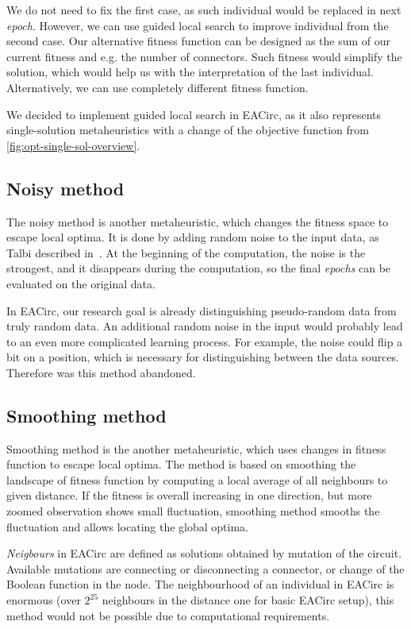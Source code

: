 \documentclass[
  print, %
  Table,   %
  nolof,     %
  nolot,     %
  11pt, %
  oneside  %
]{fithesis3}
\begin{document}
We do not need to fix the first case, as such individual would be replaced in next \textit{epoch}. However, we can use guided local search to improve individual from the second case. Our alternative fitness function can be designed as the sum of our current fitness and e.g. the number of connectors. Such fitness would simplify the solution, which would help us with the interpretation of the last individual. Alternatively, we can use completely different fitness function.

We decided to implement guided local search in EACirc, as it also represents single-solution metaheuristics with a change of the objective function from \cref{fig:opt-single-sol-overview}.

\subsection{Noisy method}
\label{subsec:opt-single-sol-nois}

The noisy method is another metaheuristic, which changes the fitness space to escape local optima. It is done by adding random noise to the input data, as Talbi described in~\cite[section 2.9.2]{talbi2009metaheuristics}. At the beginning of the computation, the noise is the strongest, and it disappears during the computation, so the final \textit{epochs} can be evaluated on the original data.

In EACirc, our research goal is already distinguishing pseudo-random data from truly random data. An additional random noise in the input would probably lead to an even more complicated learning process. For example, the noise could flip a bit on a position, which is necessary for distinguishing between the data sources. Therefore was this method abandoned.

\subsection{Smoothing method}
\label{subsec:opt-single-sol-smooth}

Smoothing method is the another metaheuristic, which uses changes in fitness function to escape local optima. The method is based on smoothing the landscape of fitness function by computing a local average of all neighbours to given distance. If the fitness is overall increasing in one direction, but more zoomed observation shows small fluctuation, smoothing method smooths the fluctuation and allows locating the global optima.

\textit{Neigbours} in EACirc are defined as solutions obtained by mutation of the circuit. Available mutations are connecting or disconnecting a connector, or change of the Boolean function in the node. The neighbourhood of an individual in EACirc is enormous (over $2^{25}$ neighbours in the distance one for basic EACirc setup), this method would not be possible due to computational requirements.
\end{document}
